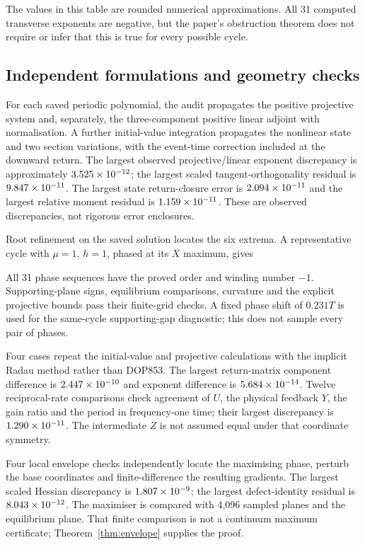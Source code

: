 \documentclass[11pt,a4paper]{article}
\numberwithin{equation}{section}
\theoremstyle{remark}\newtheorem{remark}[theorem]{Remark}
\begin{document}
\begin{center}\small\end{center}
The values in this table are rounded numerical approximations. All 31 computed transverse exponents are negative, but the paper's obstruction theorem does not require or infer that this is true for every possible cycle.

\subsection{Independent formulations and geometry checks}
For each saved periodic polynomial, the audit propagates the positive projective system and, separately, the three-component positive linear adjoint with normalisation. A further initial-value integration propagates the nonlinear state and two section variations, with the event-time correction included at the downward return. The largest observed projective/linear exponent discrepancy is approximately $3.525\times10^{-12}$; the largest scaled tangent-orthogonality residual is $9.847\times10^{-11}$. The largest state return-closure error is $2.094\times10^{-11}$ and the largest relative moment residual is $1.159\times10^{-11}$. These are observed discrepancies, not rigorous error enclosures.

Root refinement on the saved solution locates the six extrema. A representative cycle with $\mu=1$, $h=1$, phased at its $X$ maximum, gives
\begin{center}\footnotesize\end{center}
All 31 phase sequences have the proved order and winding number $-1$. Supporting-plane signs, equilibrium comparisons, curvature and the explicit projective bounds pass their finite-grid checks. A fixed phase shift of $0.231T$ is used for the same-cycle supporting-gap diagnostic; this does not sample every pair of phases.

Four cases repeat the initial-value and projective calculations with the implicit Radau method rather than DOP853. The largest return-matrix component difference is $2.447\times10^{-10}$ and exponent difference is $5.684\times10^{-14}$. Twelve reciprocal-rate comparisons check agreement of $U$, the physical feedback $Y$, the gain ratio and the period in frequency-one time; their largest discrepancy is $1.290\times10^{-11}$. The intermediate $Z$ is not assumed equal under that coordinate symmetry.

Four local envelope checks independently locate the maximising phase, perturb the base coordinates and finite-difference the resulting gradients. The largest scaled Hessian discrepancy is $1.807\times10^{-9}$; the largest defect-identity residual is $8.043\times10^{-12}$. The maximiser is compared with 4,096 sampled planes and the equilibrium plane. That finite comparison is not a continuum maximum certificate; Theorem~\ref{thm:envelope} supplies the proof.
\end{document}
